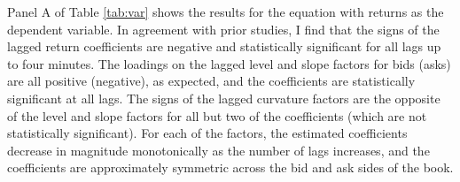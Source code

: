	Panel A of Table \ref{tab:var} shows the results for the equation with returns as the dependent variable. In agreement with prior studies, I find that the signs of the lagged return coefficients are negative and statistically significant for all lags up to four minutes. The loadings on the lagged level and slope factors for bids (asks) are all positive (negative), as expected, and the coefficients are statistically significant at all lags. The signs of the lagged curvature factors are the opposite of the level and slope factors for all but two of the coefficients (which are not statistically significant). For each of the factors, the estimated coefficients decrease in magnitude monotonically as the number of lags increases, and the coefficients are approximately symmetric across the bid and ask sides of the book.

